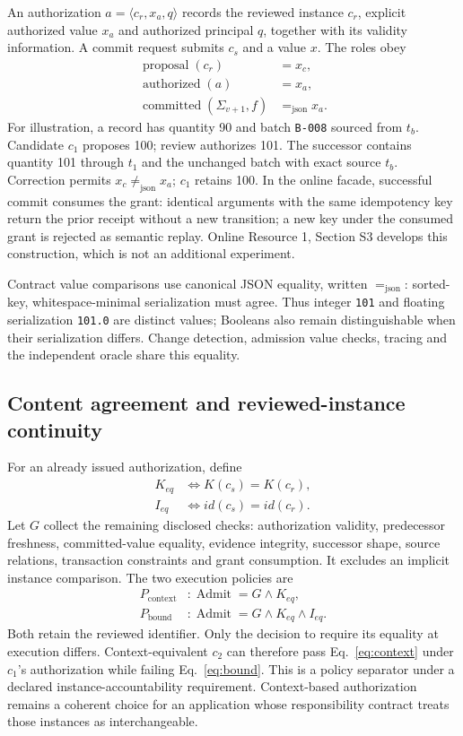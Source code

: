 \documentclass[10pt,a4paper,twocolumn]{article}
\newcommand{\jeq}{\mathrel{=_{\mathrm{json}}}}
\newcommand{\jneq}{\mathrel{\neq_{\mathrm{json}}}}
\newcommand{\context}{\mathrm{context}}
\newcommand{\bound}{\mathrm{bound}}
\begin{document}
An authorization $a=\langle c_r,x_a,q\rangle$ records the reviewed instance $c_r$, explicit authorized value $x_a$ and authorized principal $q$, together with its validity information. A commit request submits $c_s$ and a value $x$. The roles obey
\begin{align}
\operatorname{proposal}(c_r)&=x_c,\nonumber\\
\operatorname{authorized}(a)&=x_a,\nonumber\\
\operatorname{committed}(\Sigma_{v+1},f)&\jeq x_a.
\end{align}
For illustration, a record has quantity 90 and batch \texttt{B-008} sourced from $t_b$. Candidate $c_1$ proposes 100; review authorizes 101. The successor contains quantity 101 through $t_1$ and the unchanged batch with exact source $t_b$. Correction permits $x_c\jneq x_a$; $c_1$ retains 100. In the online facade, successful commit consumes the grant: identical arguments with the same idempotency key return the prior receipt without a new transition; a new key under the consumed grant is rejected as semantic replay. Online Resource 1, Section S3 develops this construction, which is not an additional experiment.

Contract value comparisons use canonical JSON equality, written $\jeq$: sorted-key, whitespace-minimal serialization must agree. Thus integer \texttt{101} and floating serialization \texttt{101.0} are distinct values; Booleans also remain distinguishable when their serialization differs. Change detection, admission value checks, tracing and the independent oracle share this equality.

\subsection{Content agreement and reviewed-instance continuity}
For an already issued authorization, define
\begin{align}
K_{eq}&\iff K(c_s)=K(c_r),\nonumber\\
I_{eq}&\iff id(c_s)=id(c_r).
\end{align}
Let $G$ collect the remaining disclosed checks: authorization validity, predecessor freshness, committed-value equality, evidence integrity, successor shape, source relations, transaction constraints and grant consumption. It excludes an implicit instance comparison. The two execution policies are
\begin{align}
P_\context&: \operatorname{Admit}=G\land K_{eq},\label{eq:context}\\
P_\bound&: \operatorname{Admit}=G\land K_{eq}\land I_{eq}.\label{eq:bound}
\end{align}
Both retain the reviewed identifier. Only the decision to require its equality at execution differs. Context-equivalent $c_2$ can therefore pass Eq.~\ref{eq:context} under $c_1$'s authorization while failing Eq.~\ref{eq:bound}. This is a policy separator under a declared instance-accountability requirement. Context-based authorization remains a coherent choice for an application whose responsibility contract treats those instances as interchangeable.
\end{document}

